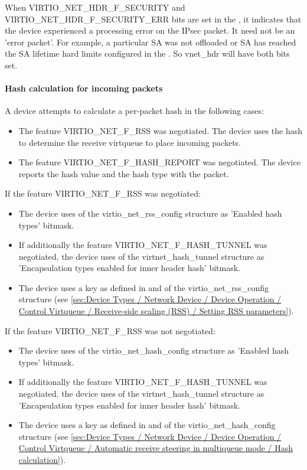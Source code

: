 When VIRTIO_NET_HDR_F_SECURITY and VIRTIO_NET_HDR_F_SECURITY_ERR bits are set in the ,
it indicates that the device experienced a processing error on the IPsec packet.
It need not be an 'error packet'. For example, a particular SA was not offloaded or
SA has reached the SA lifetime hard limits configured in the .
So vnet_hdr will have both bits set.

\paragraph{Hash calculation for incoming packets}
\label{sec:Device Types / Network Device / Device Operation / Processing of Incoming Packets / Hash calculation for incoming packets}

A device attempts to calculate a per-packet hash in the following cases:
\begin{itemize}
\item The feature VIRTIO_NET_F_RSS was negotiated. The device uses the hash to determine the receive virtqueue to place incoming packets.
\item The feature VIRTIO_NET_F_HASH_REPORT was negotiated. The device reports the hash value and the hash type with the packet.
\end{itemize}

If the feature VIRTIO_NET_F_RSS was negotiated:
\begin{itemize}
\item The device uses  of the virtio_net_rss_config structure as 'Enabled hash types' bitmask.
\item If additionally the feature VIRTIO_NET_F_HASH_TUNNEL was negotiated, the device uses  of the
      virtnet_hash_tunnel structure as 'Encapsulation types enabled for inner header hash' bitmask.
\item The device uses a key as defined in  and  of the virtio_net_rss_config structure (see
\ref{sec:Device Types / Network Device / Device Operation / Control Virtqueue / Receive-side scaling (RSS) / Setting RSS parameters}).
\end{itemize}

If the feature VIRTIO_NET_F_RSS was not negotiated:
\begin{itemize}
\item The device uses  of the virtio_net_hash_config structure as 'Enabled hash types' bitmask.
\item If additionally the feature VIRTIO_NET_F_HASH_TUNNEL was negotiated, the device uses  of the
      virtnet_hash_tunnel structure as 'Encapsulation types enabled for inner header hash' bitmask.
\item The device uses a key as defined in  and  of the virtio_net_hash_config structure (see
\ref{sec:Device Types / Network Device / Device Operation / Control Virtqueue / Automatic receive steering in multiqueue mode / Hash calculation}).
\end{itemize}

